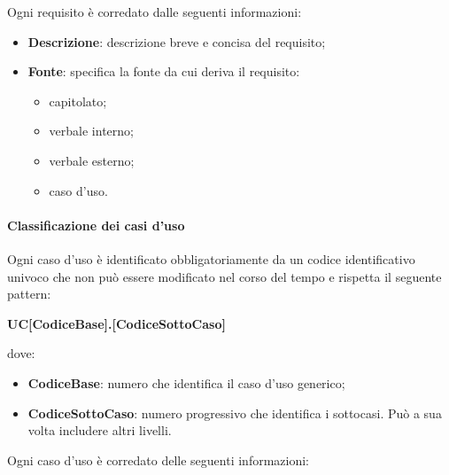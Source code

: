 Ogni requisito è corredato dalle seguenti informazioni:
\begin{itemize}
  \item \textbf{Descrizione}: descrizione breve e concisa del requisito;
  \item \textbf{Fonte}: specifica la fonte da cui deriva il requisito:
        \begin{itemize}
          \item capitolato;
          \item verbale interno;
          \item verbale esterno;
          \item caso d'uso.
        \end{itemize}
\end{itemize}

\paragraph{Classificazione dei casi d'uso} \label{_classificazioneCasiUso}
Ogni caso d'uso è identificato obbligatoriamente da un codice identificativo univoco che non può essere modificato nel corso del tempo e rispetta il seguente pattern:
\begin{center}
  \textbf{UC[CodiceBase].[CodiceSottoCaso]}
\end{center}

dove:

\begin{itemize}
  \item \textbf{CodiceBase}: numero che identifica il caso d'uso generico;
  \item \textbf{CodiceSottoCaso}: numero progressivo che identifica i sottocasi.  Può a sua volta includere altri livelli.
\end{itemize}

Ogni caso d'uso è corredato delle seguenti informazioni:


